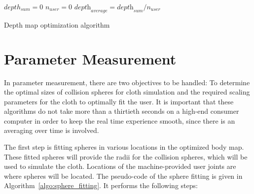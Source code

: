 \begin{algorithm}[ht]
\DontPrintSemicolon %
$depth_{sum}=0$ \;
$n_{user} =0$\;
$\textit{depth}_\textit{average}=\textit{depth}_\textit{sum}/n_\textit{user}$ \;
 
\caption{Depth map optimization algorithm}
\label{algo:depth_patch}
\end{algorithm}

\section{Parameter Measurement}
In parameter measurement, there are two objectives to be handled: To determine the optimal sizes of collision spheres for cloth simulation and the required scaling parameters for the cloth to optimally fit the user. It is important that these algorithms do not take more than a thirtieth seconds on a high-end consumer computer in order to keep the real time experience smooth, since there is an averaging over time is involved.

The first step is fitting spheres in various locations in the optimized body map. These fitted spheres will provide the radii for the collision spheres, which will be used to simulate the cloth. Locations of the machine-provided user joints are where spheres will be located. The pseudo-code of the sphere fitting is given in Algorithm~\ref{algo:sphere_fitting}. It performs the following steps: 

